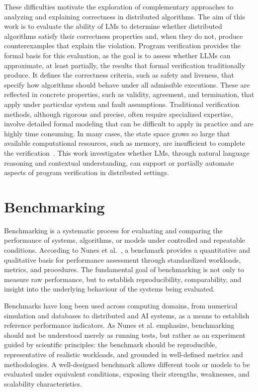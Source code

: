These difficulties motivate the exploration of complementary approaches to analyzing and explaining correctness in distributed algorithms. 
The aim of this work is to evaluate the ability of LMs to determine whether distributed algorithms satisfy their correctness properties and, when they do not, produce counterexamples that explain the violation. Program verification provides the formal basis for this evaluation, as the goal is to assess whether LLMs can approximate, at least partially, the results that formal verification traditionally produce. It defines the correctness criteria, such as safety and liveness, that specify how algorithms should behave under all admissible executions. These are reflected in concrete properties, such as validity, agreement, and termination, that apply under particular system and fault assumptions. Traditional verification methods, although rigorous and precise, often require specialized expertise, involve detailed formal modeling that can be difficult to apply in practice and are highly time consuming. In many cases, the state space grows so large that available computational resources, such as memory, are insufficient to complete the verification~\cite{Delzanno_2014}. This work investigates whether LMs, through natural language reasoning and contextual understanding, can support or partially automate aspects of program verification in distributed settings.

\section{Benchmarking}

Benchmarking is a systematic process for evaluating and comparing the performance of systems, algorithms, or models under controlled and repeatable conditions. 
According to Nunes et al.~\cite{nunes2018benchmarking}, a benchmark provides a quantitative and qualitative basis for performance assessment through standardized workloads, metrics, and procedures. 
The fundamental goal of benchmarking is not only to measure raw performance, but to establish reproducibility, comparability, and insight into the underlying behaviour of the systems being evaluated.

Benchmarks have long been used across computing domains, from numerical simulation\cite{hoang2013benchmarkVOF} and databases\cite{rubenstein1987benchmarking} to distributed\cite{truica2021textbends} and AI systems\cite{eyuboglu2022dcbench}, as a means to establish reference performance indicators. 
As Nunes et al. emphasize, benchmarking should not be understood merely as running tests, but rather as an experiment guided by scientific principles: the benchmark should be reproducible, representative of realistic workloads, and grounded in well-defined metrics and methodologies. 
A well-designed benchmark allows different tools or models to be evaluated under equivalent conditions, exposing their strengths, weaknesses, and scalability characteristics.

